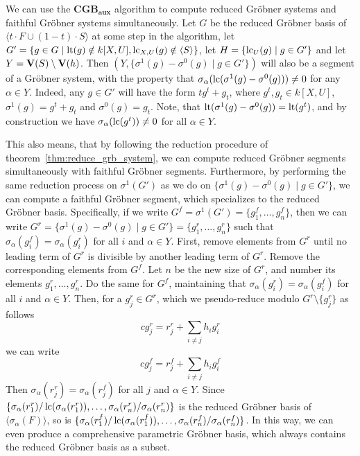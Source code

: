 \begin{remark}\label{rem:CGS_CGB_together}\upshape
  We can use the $\mathbf{CGB_{aux}}$ algorithm to compute reduced Gröbner systems and faithful Gröbner systems simultaneously. Let $G$ be the reduced Gröbner basis of $\langle t \cdot F \cup (1 - t) \cdot S \rangle$ at some step in the algorithm, let $G' = \{g \in G \mid \operatorname{lt}(g) \notin k[X, U], \operatorname{lc}_{X, U}(g) \notin \langle S \rangle\}$, let $H = \{\operatorname{lc}_{U}(g) \mid g \in G'\}$ and let $Y = \operatorname{\mathbf V}(S) \setminus \operatorname{\mathbf V}(h)$. Then $(Y, \{\sigma^{1}(g) - \sigma^{0}(g) \mid g \in G'\})$ will also be a segment of a Gröbner system, with the property that $\sigma_{\alpha}(\operatorname{lc}(\sigma^{1}(g) - \sigma^{0}(g))) \neq 0$ for any $\alpha \in Y$. Indeed, any $g \in G'$ will have the form $t g^{t} + g_{t}$, where $g^{t}, g_{t} \in k[X, U]$, $\sigma^{1}(g) = g^{t} + g_{t}$ and $\sigma^{0}(g) = g_{t}$. Note, that $\operatorname{lt}(\sigma^{1}(g) - \sigma^{0}(g)) = \operatorname{lt}(g^{t})$, and by construction we have $\sigma_{\alpha}(\operatorname{lc}(g^{t})) \neq 0$ for all $\alpha \in Y$.

  This also means, that by following the reduction procedure of theorem~\ref{thm:reduce_grb_system}, we can compute reduced Gröbner segments simultaneously with faithful Gröbner segments. Furthermore, by performing the same reduction process on $\sigma^{1}(G')$ as we do on $\{\sigma^{1}(g) - \sigma^{0}(g) \mid g \in G'\}$, we can compute a faithful Gröbner segment, which specializes to the reduced Gröbner basis. Specifically, if we write $G^{f} = \sigma^{1}(G') = \{g^{f}_{1}, \dots, g^{f}_{n}\}$, then we can write $G^{r} = \{\sigma^{1}(g) - \sigma^{0}(g) \mid g \in G'\} = \{g^{r}_{1}, \dots, g^{r}_{n}\}$ such that $\sigma_{\alpha}(g^{f}_{i}) = \sigma_{\alpha}(g^{r}_{i})$ for all $i$ and $\alpha \in Y$. First, remove elements from $G^{r}$ until no leading term of $G^{r}$ is divisible by another leading term of $G^{r}$. Remove the corresponding elements from $G^{f}$. Let $n$ be the new size of $G^{r}$, and number its elements $g^{r}_{1}, \dots, g^{r}_{n}$. Do the same for $G^{f}$, maintaining that $\sigma_{\alpha}(g^{r}_{i}) = \sigma_{\alpha}(g^{f}_{i})$ for all $i$ and $\alpha \in Y$. Then, for a $g^{r}_{j} \in G^{r}$, which we pseudo-reduce modulo $G^{r} \setminus \{g^{r}_{j}\}$ as follows
  \[c g^{r}_{j} = r^{r}_{j} + \sum_{i \neq j} h_{i} g^{r}_{i}\]
  we can write
  \[c g^{f}_{j} = r^{f}_{j} + \sum_{i \neq j} h_{i} g^{f}_{i}\]
  Then $\sigma_{\alpha}(r^{r}_{j}) = \sigma_{\alpha}(r^{f}_{j})$ for all $j$ and $\alpha \in Y$. Since $\{\sigma_{\alpha}(r^{r}_{1})/\operatorname{lc}(\sigma_{\alpha}(r^{r}_{1})), \dots, \sigma_{\alpha}(r^{r}_{n})/\sigma_{\alpha}(r^{r}_{n})\}$ is the reduced Gröbner basis of $\langle \sigma_{\alpha}(F) \rangle$, so is $\{\sigma_{\alpha}(r^{f}_{1})/\operatorname{lc}(\sigma_{\alpha}(r^{f}_{1})), \dots, \sigma_{\alpha}(r^{f}_{n})/\sigma_{\alpha}(r^{f}_{n})\}$. In this way, we can even produce a comprehensive parametric Gröbner basis, which always contains the reduced Gröbner basis as a subset.


\end{remark}
